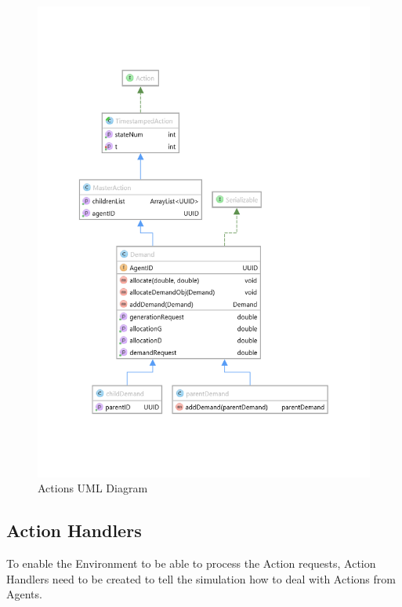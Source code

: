 \begin{figure}[!h]
	\centering
	\includegraphics[scale=0.5]{Images/ActionUML.png}
	\caption{Actions UML Diagram}
	\label{fig:ActionUML}
\end{figure}

\subsection*{Action Handlers} %
To enable the Environment to be able to process the Action requests, Action Handlers need to be created to tell the simulation how to deal with Actions from Agents.

